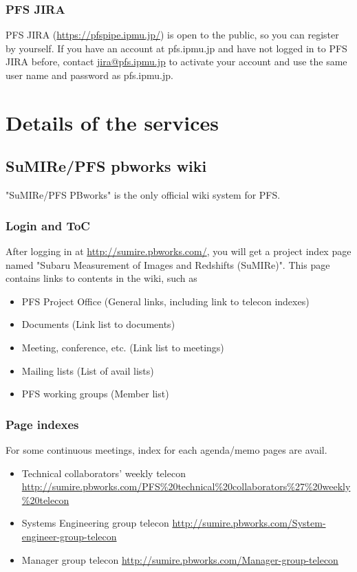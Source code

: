 \documentclass[a4paper,notitlepage]{article}
\begin{document}
\subsubsection{PFS JIRA}

PFS JIRA (\url{https://pfspipe.ipmu.jp/}) is open to the public, 
so you can register by yourself. 
If you have an account at pfs.ipmu.jp and have not logged in to PFS JIRA 
before, contact \url{jira@pfs.ipmu.jp} to activate your account and use 
the same user name and password as pfs.ipmu.jp. 

\section{Details of the services}

\subsection{SuMIRe/PFS pbworks wiki}

"SuMIRe/PFS PBworks" is the only official wiki system for PFS. 

\subsubsection{Login and ToC}

After logging in at \url{http://sumire.pbworks.com/}, 
you will get a project index page named 
"Subaru Measurement of Images and Redshifts (SuMIRe)". 
This page contains links to contents in the wiki, such as 

\begin{itemize}
  \item PFS Project Office (General links, including link to telecon indexes)
  \item Documents (Link list to documents)
  \item Meeting, conference, etc.  (Link list to meetings)
  \item Mailing lists (List of avail lists)
  \item PFS working groups (Member list)
\end{itemize}

\subsubsection{Page indexes}

For some continuous meetings, index for each agenda/memo pages are avail.

\begin{itemize}
  \item Technical collaborators' weekly telecon \url{http://sumire.pbworks.com/PFS%20technical%20collaborators%27%20weekly%20telecon}
  \item Systems Engineering group telecon \url{http://sumire.pbworks.com/System-engineer-group-telecon}
  \item Manager group telecon \url{http://sumire.pbworks.com/Manager-group-telecon}
\end{itemize}
\end{document}
